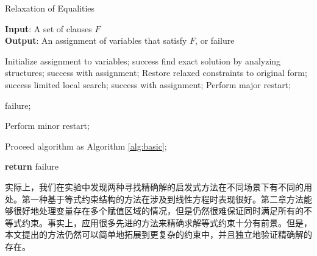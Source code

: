 \begin{algorithm}[t]
    \caption{Relaxation of Equalities}
    \label{alg:relaxation}
    \textbf{Input}: A set of clauses $F$ \\
    \textbf{Output}: An assignment of variables that satisfy $F$, or failure
    
    \begin{algorithmic}[1] %
        \Statex \hrulefill
        \STATE Initialize assignment to variables;
        \While {\top}
            \STATE success \leftarrow find exact solution by analyzing structures;
            \RETURN success with assignment;
            \ELSE
            \STATE Restore relaxed constraints to original form;
            \STATE success \leftarrow limited local search;
            \RETURN success with assignment;
            \ELSE
            \STATE Perform major restart;
            \ENDIF
            \ENDIF
            \ENDIF

            \RETURN failure;
            \ENDIF

            \STATE Perform minor restart;
            \ENDIF
            
            \STATE Proceed algorithm as Algorithm \ref{alg:basic};
        \EndWhile

        \STATE \textbf{return} failure
    \end{algorithmic}
\end{algorithm}

实际上，我们在实验中发现两种寻找精确解的启发式方法在不同场景下有不同的用处。第一种基于等式约束结构的方法在涉及到线性方程时表现很好。第二章方法能够很好地处理变量存在多个赋值区域的情况，但是仍然很难保证同时满足所有的不等式约束。事实上，应用很多先进的方法来精确求解等式约束十分有前景\cite{CimattiGLS22, LiXZ23b}。但是，本文提出的方法仍然可以简单地拓展到更复杂的约束中，并且独立地验证精确解的存在。




